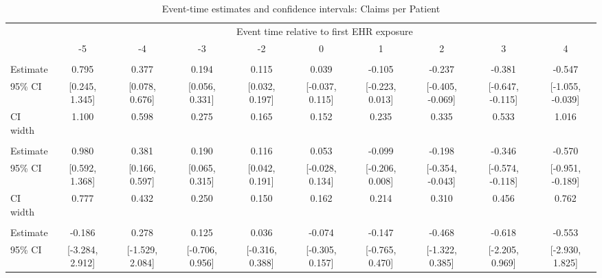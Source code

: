 
\begin{landscape}\begin{table}[!h]
\centering
\caption{\label{tab:ci_claim_per_patient}Event-time estimates and confidence intervals: Claims per Patient}
\centering
\fontsize{9}{11}\selectfont
\begin{tabular}[t]{lccccccccc}
\toprule
\multicolumn{1}{c}{ } & \multicolumn{9}{c}{Event time relative to first EHR exposure} \\
\cmidrule(l{3pt}r{3pt}){2-10}
 & -5 & -4 & -3 & -2 & 0 & 1 & 2 & 3 & 4\\
\midrule
\addlinespace[0.3em]
\multicolumn{10}{l}{\textbf{All}}\\
\hspace{1em}Estimate & 0.795 & 0.377 & 0.194 & 0.115 & 0.039 & -0.105 & -0.237 & -0.381 & -0.547\\
\hspace{1em}95\% CI & {}[0.245, 1.345] & {}[0.078, 0.676] & {}[0.056, 0.331] & {}[0.032, 0.197] & {}[-0.037, 0.115] & {}[-0.223, 0.013] & {}[-0.405, -0.069] & {}[-0.647, -0.115] & {}[-1.055, -0.039]\\
\hspace{1em}CI width & 1.100 & 0.598 & 0.275 & 0.165 & 0.152 & 0.235 & 0.335 & 0.533 & 1.016\\
\addlinespace[0.3em]
\multicolumn{10}{l}{\textbf{Age $<$ 60}}\\
\hspace{1em}Estimate & 0.980 & 0.381 & 0.190 & 0.116 & 0.053 & -0.099 & -0.198 & -0.346 & -0.570\\
\hspace{1em}95\% CI & {}[0.592, 1.368] & {}[0.166, 0.597] & {}[0.065, 0.315] & {}[0.042, 0.191] & {}[-0.028, 0.134] & {}[-0.206, 0.008] & {}[-0.354, -0.043] & {}[-0.574, -0.118] & {}[-0.951, -0.189]\\
\hspace{1em}CI width & 0.777 & 0.432 & 0.250 & 0.150 & 0.162 & 0.214 & 0.310 & 0.456 & 0.762\\
\addlinespace[0.3em]
\multicolumn{10}{l}{\textbf{Age $\geq$ 60}}\\
\hspace{1em}Estimate & -0.186 & 0.278 & 0.125 & 0.036 & -0.074 & -0.147 & -0.468 & -0.618 & -0.553\\
\hspace{1em}95\% CI & {}[-3.284, 2.912] & {}[-1.529, 2.084] & {}[-0.706, 0.956] & {}[-0.316, 0.388] & {}[-0.305, 0.157] & {}[-0.765, 0.470] & {}[-1.322, 0.385] & {}[-2.205, 0.969] & {}[-2.930, 1.825]\\

\end{tabular}
\end{table}
\end{landscape}

